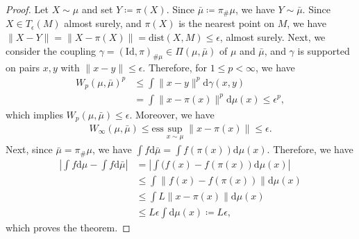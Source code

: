 \documentclass{article}
\begin{document}
\begin{proof}
	Let $X\sim \mu$ and set $Y\coloneqq \pi(X)$. Since $\bar{\mu}\coloneqq \pi_{\#}\mu$, we have $Y\sim\bar{\mu}$. Since $X\in T_\epsilon(M)$ almost surely, and $\pi(X)$ is the nearest point on $M$, we have $\|X-Y\| = \|X- \pi(X)\| = \mathrm{dist}(X,M) \leq \epsilon$, almost surely. Next, we consider the coupling $\gamma = (\mathrm{Id},\pi)_{\#\mu} \in \Pi(\mu,\bar{\mu})$ of $\mu$ and $\bar{\mu}$, and $\gamma$ is supported on pairs $x,y$ with $\|x-y\|\leq \epsilon$. Therefore, for $1\leq p <\infty$, we have
	\begin{align*}
		W_p(\mu,\bar{\mu})^p & \leq \int \|x-y\|^p \mathrm d\gamma(x,y)               \\
		                     & = \int \|x-\pi(x)\|^p \mathrm d\mu(x) \leq \epsilon^p,
	\end{align*}
	which implies $W_p(\mu,\bar{\mu})\leq \epsilon$. Moreover, we have
	\begin{align*}
		W_\infty(\mu,\bar{\mu})\leq \mathrm{ess} \sup_{x\sim \mu} \| x - \pi(x)\| \leq \epsilon.
	\end{align*}
	Next, since $\bar{\mu} = \pi_{\#}\mu$, we have
	$\int f\mathrm d\bar{\mu} = \int f(\pi(x)) \mathrm d\mu(x)$. Therefore, we have
	\begin{align*}
		\left|\int  f\mathrm d\mu - \int f \mathrm d\bar{\mu}\right| & = \left|\int (f(x) - f(\pi(x)) \mathrm d\mu(x)\right|     \\
		                                                             & \leq \int \| f(x) - f(\pi(x)) \| \mathrm d\mu(x)          \\
		                                                             & \leq \int L \| x - \pi(x)\| \mathrm d\mu(x)               \\
		                                                             & \leq L \epsilon \int \mathrm d\mu(x) \coloneqq L\epsilon,
	\end{align*}
	which proves the theorem.
\end{proof}





%     
\end{document}
